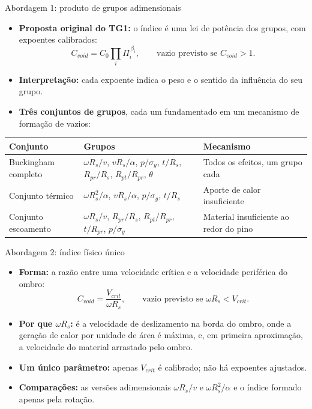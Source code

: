 \documentclass[aspectratio=169,11pt]{beamer}
\newenvironment{bullets}{\begin{itemize}\setlength{\itemsep}{5pt}}{\end{itemize}}
\begin{document}
\begin{frame}{Abordagem 1: produto de grupos adimensionais}
\begin{bullets}
  \item \textbf{Proposta original do TG1:} o índice é uma lei de potência dos grupos, com expoentes calibrados:
  \[ C_{void} = C_0 \prod_{i} \Pi_{i}^{\,\beta_i}, \qquad \text{vazio previsto se } C_{void} > 1. \]
  \item \textbf{Interpretação:} cada expoente indica o peso e o sentido da influência do seu grupo.
  \item \textbf{Três conjuntos de grupos}, cada um fundamentado em um mecanismo de formação de vazios:
\end{bullets}
\centering\scriptsize
\begin{tabularx}{\textwidth}{L{3.2cm} L{6.6cm} Y}
\toprule
\textbf{Conjunto} & \textbf{Grupos} & \textbf{Mecanismo} \\ \midrule
Buckingham completo & $\omega R_s/v$, $vR_s/\alpha$, $p/\sigma_y$, $t/R_s$, $R_{pr}/R_s$, $R_{pt}/R_{pr}$, $\theta$ & Todos os efeitos, um grupo cada \\
Conjunto térmico & $\omega R_{s}^{2}/\alpha$, $vR_s/\alpha$, $p/\sigma_y$, $t/R_s$ & Aporte de calor insuficiente \\
Conjunto escoamento & $\omega R_s/v$, $R_{pr}/R_s$, $R_{pt}/R_{pr}$, $t/R_{pr}$, $p/\sigma_y$ & Material insuficiente ao redor do pino \\ \bottomrule
\end{tabularx}
\end{frame}

\begin{frame}{Abordagem 2: índice físico único}
\begin{bullets}
  \item \textbf{Forma:} a razão entre uma velocidade crítica e a velocidade periférica do ombro:
  \[ C_{void} = \frac{V_{crit}}{\omega R_s}, \qquad \text{vazio previsto se } \omega R_s < V_{crit}. \]
  \item \textbf{Por que $\omega R_s$:} é a velocidade de deslizamento na borda do ombro, onde a geração de calor por unidade de área é máxima, e, em primeira aproximação, a velocidade do material arrastado pelo ombro.
  \item \textbf{Um único parâmetro:} apenas $V_{crit}$ é calibrado; não há expoentes ajustados.
  \item \textbf{Comparações:} as versões adimensionais $\omega R_s/v$ e $\omega R_{s}^{2}/\alpha$ e o índice formado apenas pela rotação.
\end{bullets}
\end{frame}
\end{document}
